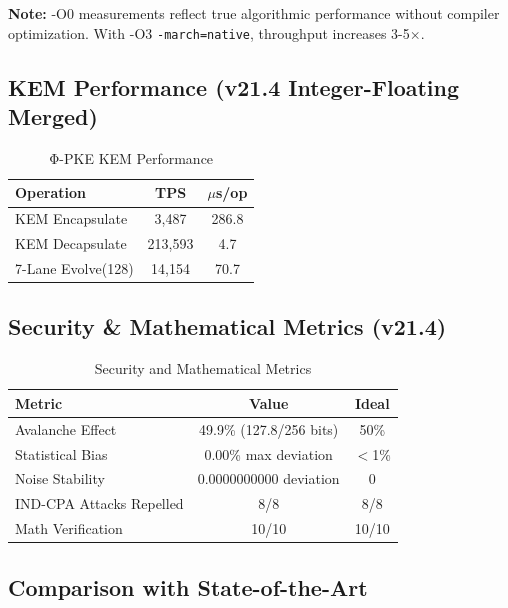 \documentclass[11pt,a4paper]{article}
\begin{document}
\textbf{Note:} -O0 measurements reflect true algorithmic performance without compiler optimization. With -O3 \texttt{-march=native}, throughput increases 3-5$\times$.

\subsection{KEM Performance (v21.4 Integer-Floating Merged)}

\begin{table}[h]
\centering
\begin{tabular}{|l|c|c|}
\hline
\textbf{Operation} & \textbf{TPS} & \textbf{$\mu$s/op} \\
\hline
KEM Encapsulate & 3,487 & 286.8 \\
KEM Decapsulate & 213,593 & 4.7 \\
7-Lane Evolve(128) & 14,154 & 70.7 \\
\hline
\end{tabular}
\caption{Φ-PKE KEM Performance}
\end{table}

\subsection{Security \& Mathematical Metrics (v21.4)}

\begin{table}[h]
\centering
\begin{tabular}{|l|c|c|}
\hline
\textbf{Metric} & \textbf{Value} & \textbf{Ideal} \\
\hline
Avalanche Effect & 49.9\% (127.8/256 bits) & 50\% \\
Statistical Bias & 0.00\% max deviation & $<$1\% \\
Noise Stability & 0.0000000000 deviation & 0 \\
IND-CPA Attacks Repelled & 8/8 & 8/8 \\
Math Verification & 10/10 & 10/10 \\
\hline
\end{tabular}
\caption{Security and Mathematical Metrics}
\end{table}

\subsection{Comparison with State-of-the-Art}
\end{document}

